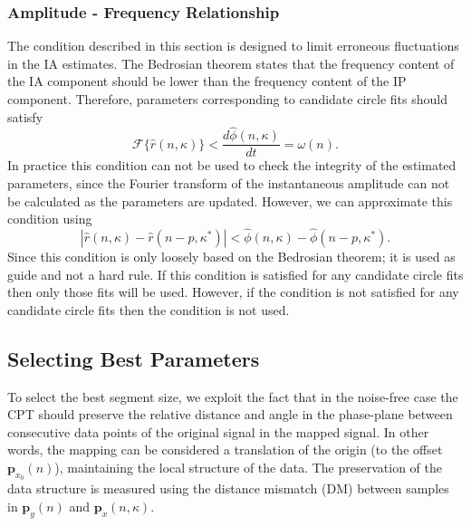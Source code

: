 \documentclass[journal,11pt,a4paper,onecolumn,draftcls]{IEEEtran}
\begin{document}
\subsubsection{Amplitude - Frequency Relationship}
The condition described in this section is designed to limit erroneous fluctuations in the IA estimates. The Bedrosian theorem states that the frequency content of the IA component should be lower than the frequency content of the IP component. Therefore, parameters corresponding to candidate circle fits should satisfy
\begin{equation}
	\mathcal{F}\{\hat{r}\left(n,\kappa\right)\} < \frac{d\hat{\phi}\left(n,\kappa \right)}{dt}=\omega(n).
\end{equation}
In practice this condition can not be used to check the integrity of the estimated parameters, since the Fourier transform of the instantaneous amplitude can not be calculated as the parameters are updated. However, we can approximate this condition using
\begin{equation}\label{eq:Prior2}
    \left| {\hat{r}\left(n,\kappa\right) - \hat{r}\left(n-p,\kappa^*\right)} \right| < \hat{\phi}\left(n,\kappa \right) - \hat{\phi}\left(n-p,\kappa^*\right).
\end{equation}
Since this condition is only loosely based on the Bedrosian theorem; it is used as guide and not a hard rule. If this condition is satisfied for any candidate circle fits then only those fits will be used. However, if the condition is not satisfied for any candidate circle fits then the condition is not used.

\subsection{Selecting Best Parameters}\label{sect:BestParameters}
To select the best segment size, we exploit the fact that in the noise-free case the CPT should preserve the relative distance and angle in the phase-plane between consecutive data points of the original signal in the mapped signal. In other words, the mapping can be considered a translation of the origin (to the offset $\mathbf{p}_{x_0}\left(n\right)$), maintaining the local structure of the data. The preservation of the data structure is measured using the distance mismatch (DM) between samples in $\mathbf{p}_y(n)$ and $\mathbf{p}_x(n,\kappa)$. 
\end{document}
